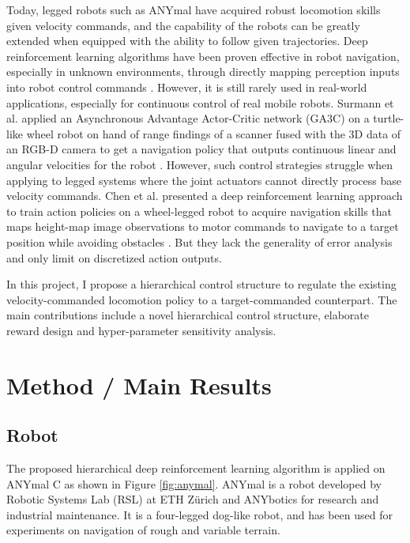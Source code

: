 \documentclass{article}
\begin{document}


Today, legged robots such as ANYmal have acquired robust locomotion skills given velocity commands, and the capability of the robots can be greatly extended when equipped with the ability to follow given trajectories. Deep reinforcement learning algorithms have been proven effective in robot navigation, especially in unknown environments, through directly mapping perception inputs into robot control commands \cite{DBLP:journals/corr/abs-2108-06161}. However, it is still rarely used in real-world applications, especially for continuous control of real mobile robots. Surmann et al. applied an Asynchronous Advantage Actor-Critic network (GA3C) on a turtle-like wheel robot on hand of range findings of a scanner fused with
the 3D data of an RGB-D camera to get a navigation policy that outputs continuous linear and angular velocities for the robot \cite{DBLP:journals/corr/abs-2005-13857}. However, such control strategies struggle when applying to legged systems where the joint actuators cannot directly process base velocity commands. Chen et al. presented a deep reinforcement learning approach to train action policies on a wheel-legged robot to acquire navigation skills that maps height-map image observations to motor commands to navigate to a target position while avoiding obstacles \cite{DBLP:journals/corr/abs-1804-10500}. But they lack the generality of error analysis and only limit on discretized action outputs.


In this project, I propose a hierarchical control structure to regulate the existing velocity-commanded locomotion policy to a target-commanded counterpart. The main contributions include a novel hierarchical control structure, elaborate reward design and hyper-parameter sensitivity analysis.



\section{Method / Main Results}

\subsection{Robot}
The proposed hierarchical deep reinforcement learning algorithm is applied on ANYmal C as shown in Figure \ref{fig:anymal}. ANYmal is a robot developed by Robotic Systems Lab (RSL) at ETH Zürich and ANYbotics for research and industrial maintenance. It is a four-legged dog-like robot, and has been used for experiments on navigation of rough and variable terrain.
\end{document}
